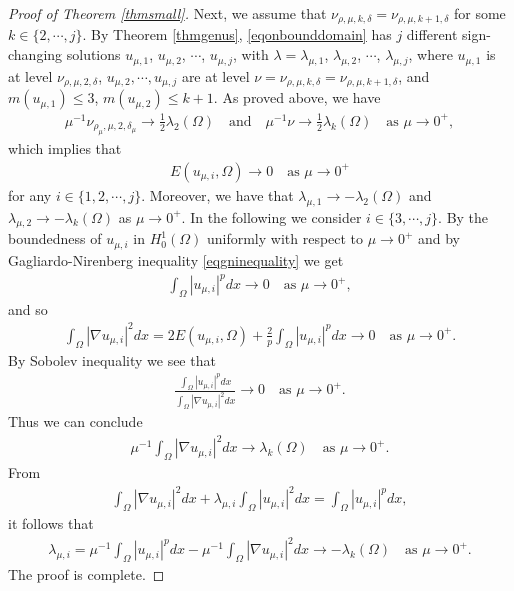 \documentclass[10pt,a4paper]{article}
\theoremstyle{definition} \theoremstyle{remark}
\numberwithin{equation}{section}
\newcommand{\la}{\lambda}
\begin{document}
\begin{proof}[Proof of Theorem \ref{thmsmall}]
Next, we assume that $\nu_{\rho,\mu,k,\delta} = \nu_{\rho,\mu,k+1,\delta}$ for some $k \in \{2,\cdots,j\}$. By Theorem \ref{thmgenus}, \eqref{eqonbounddomain} has $j$ different sign-changing solutions $u_{\mu,1}$, $u_{\mu,2}$, $\cdots$, $u_{\mu,j}$, with $\la = \la_{\mu,1}$, $\la_{\mu,2}$, $\cdots$, $\la_{\mu,j}$, where $u_{\mu,1}$ is at level $\nu_{\rho,\mu,2,\delta}$, $u_{\mu,2}, \cdots, u_{\mu,j}$ are at level $\nu = \nu_{\rho,\mu,k,\delta} = \nu_{\rho,\mu,k+1,\delta}$, and $m(u_{\mu,1}) \le 3$, $m(u_{\mu,2}) \le k+1$. As proved above, we have
\begin{align*}
	\mu^{-1}\nu_{\rho_\mu,\mu,2,\delta_\mu} \to \frac12\la_2(\Omega) \quad \text{and} \quad \mu^{-1}\nu \to \frac12\la_{k}(\Omega) \quad \text{as } \mu \to 0^+,
\end{align*}
which implies that
\begin{align*}
	E(u_{\mu,i},\Omega) \to 0 \quad \text{as } \mu \to 0^+
\end{align*}
for any $i \in \{1,2,\cdots,j\}$. Moreover, we have that $\la_{\mu,1} \to -\la_2(\Omega)$ and $\la_{\mu,2} \to -\la_k(\Omega)$ as $\mu \to 0^+$. In the following we consider $i \in \{3,\cdots,j\}$. By the boundedness of $u_{\mu,i}$ in $H_0^1(\Omega)$ uniformly with respect to $\mu \to 0^+$ and by Gagliardo-Nirenberg inequality \eqref{eqgninequality} we get
\begin{align*}
	\int_\Omega|u_{\mu,i}|^pdx \to 0 \quad \text{as } \mu \to 0^+,
\end{align*}
and so
\begin{align*}
	\int_\Omega |\nabla u_{\mu,i}|^2dx = 2E(u_{\mu,i},\Omega) + \frac2p\int_\Omega |u_{\mu,i}|^pdx \to 0 \quad \text{as } \mu \to 0^+.
\end{align*}
By Sobolev inequality we see that
\begin{align*}
	\frac{\int_\Omega |u_{\mu,i}|^pdx}{\int_\Omega |\nabla u_{\mu,i}|^2dx} \to 0 \quad \text{as } \mu \to 0^+.
\end{align*}
Thus we can conclude
\begin{align*}
	\mu^{-1}\int_\Omega|\nabla u_{\mu,i}|^2dx \to \la_k(\Omega) \quad \text{as } \mu \to 0^+.
\end{align*}
From
\begin{align*}
	\int_\Omega |\nabla u_{\mu,i}|^2 dx + \la_{\mu,i} \int_\Omega |u_{\mu,i}|^2dx = \int_\Omega |u_{\mu,i}|^p dx,
\end{align*}
it follows that
\begin{align*}
	\la_{\mu,i} = \mu^{-1}\int_\Omega |u_{\mu,i}|^p dx - \mu^{-1}\int_\Omega |\nabla u_{\mu,i}|^2 dx \to -\la_k(\Omega) \quad \text{as } \mu \to 0^+.
\end{align*}
The proof is complete.
\end{proof}
\end{document}
